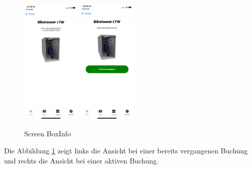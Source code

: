 \begin{figure}[H]
    \centering
    \includegraphics[width=0.25\textwidth]{images/app-screenshots/screenboxinfo.png}
    \includegraphics[width=0.25\textwidth]{images/app-screenshots/screenboxinfov.png}
    \caption{Screen BoxInfo}
    \label{fig:screenboxinfo}
\end{figure}
Die Abbildung \ref{fig:screenboxinfo} zeigt links die Ansicht bei einer bereits vergangenen Buchung und rechts die Ansicht bei einer aktiven Buchung.\\


